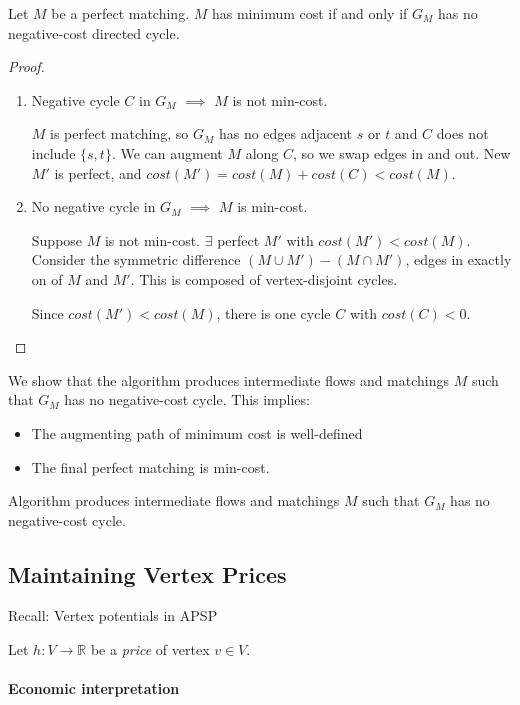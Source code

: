 \begin{mylemma}
Let $M$ be a perfect matching. $M$ has minimum cost if and only if $G_M$ has no negative-cost directed cycle.
\end{mylemma}
\begin{proof}
\begin{enumerate}
\item Negative cycle $C$ in $G_M$ $\implies$ $M$ is not min-cost.

$M$ is perfect matching, so $G_M$ has no edges adjacent $s$ or $t$ and $C$ does not include $\{s,t\}$. We can augment $M$ along $C$, so we swap edges in and out.
New $M'$ is perfect, and ${cost}(M') = {cost}(M) + {cost}(C) < {cost}(M)$.

\item No negative cycle in $G_M$ $\implies$ $M$ is min-cost.

Suppose $M$ is not min-cost. $\exists$ perfect $M'$ with ${cost}(M') < {cost}(M)$. Consider the symmetric difference $(M \cup M') - (M \cap M')$, edges in exactly on of $M$ and $M'$. This is composed of vertex-disjoint cycles.

Since ${cost}(M') < {cost}(M)$, there is one cycle $C$ with ${cost}(C)<0$.
\end{enumerate}
\end{proof}

We show that the algorithm produces intermediate flows and matchings $M$ such that $G_M$ has no negative-cost cycle. This implies:
\begin{itemize}
\item The augmenting path of minimum cost is well-defined
\item The final perfect matching is min-cost.
\end{itemize}

Algorithm produces intermediate flows and matchings $M$ such that $G_M$ has no negative-cost cycle.

\subsection{Maintaining Vertex Prices}

Recall: Vertex potentials in APSP

\noindent Let $h: V \rightarrow \mathbb{R}$ be a \emph{price} of vertex $v \in V$.

\paragraph{Economic interpretation}

